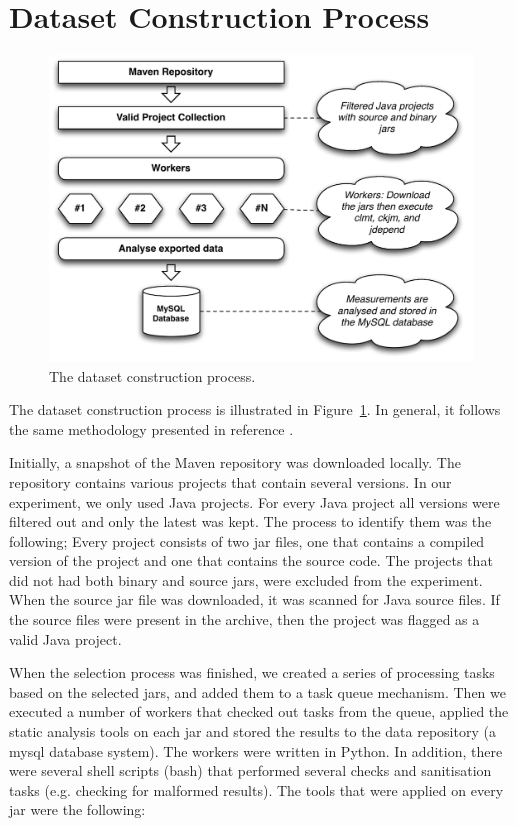 \documentclass[conference]{IEEEtran}
\begin{document}
\section{Dataset Construction Process}
\label{sec:data}

\begin{figure}
\centering
\includegraphics[scale=0.45]{import-process}
\caption{The dataset construction process.}
\label{fig:dataset-construction}
\end{figure}

The dataset construction process is illustrated in Figure~\ref{fig:dataset-construction}. In general, it follows the same methodology presented in reference \cite{MKLGS14}.

Initially, a snapshot of the Maven repository was downloaded locally. The repository contains various projects that contain several versions. In our experiment, we only used Java projects. For every Java project all versions were filtered out and only the latest was kept. The process to identify them was the following; Every project consists of two {\sc jar} files, one that contains a compiled version of the project and one that contains the source code. The projects that did not had both binary and source {\sc jar}s, were excluded from the experiment. When the source {\sc jar} file was downloaded, it was scanned for Java source files. If the source files were present in the archive, then the project was flagged as a valid Java project.

When the selection process was finished, we created a series of processing tasks based on the selected {\sc jar}s, and added them to a task queue mechanism. Then we executed a number of workers that checked out tasks from the queue, applied the static analysis tools on each {\sc jar} and stored the results to the data repository (a {\sc m}y{\sc sql} database system). The workers were written in Python. In addition, there were several shell scripts (bash) that performed several checks and sanitisation tasks (e.g. checking for malformed results). The tools that were applied on every {\sc jar} were the following:
\end{document}
